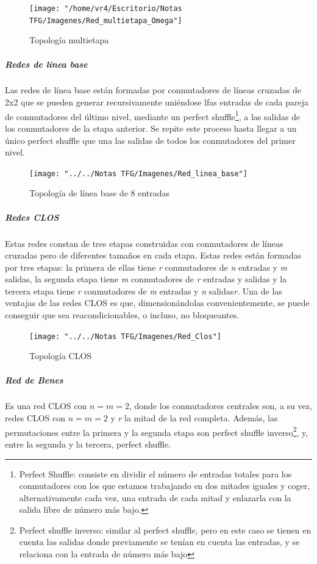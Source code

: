 \newpage			

			\begin{figure}[H]
				\centering
				\texttt{[image: "/home/vr4/Escritorio/Notas TFG/Imagenes/Red\_multietapa\_Omega"]}
				\caption{Topología multietapa}
				\label{fig:redmultietapa}
			\end{figure}
		
\subparagraph{Redes de línea base} 
Las redes de línea base están formadas por conmutadores de líneas cruzadas de 2x2 que se pueden generar recursivamente uniéndose lfas entradas de cada pareja de conmutadores del último nivel, mediante un perfect shuffle\footnote{Perfect Shuffle: consiste en dividir el número de entradas totales para los conmutadores con los que estamos trabajando en dos mitades iguales y coger, alternativamente cada vez, una entrada de cada mitad y enlazarla con la salida libre de número más bajo.}, a las salidas de los conmutadores de la etapa anterior. Se repite este proceso hasta llegar a un único perfect shuffle que una las salidas de todos los conmutadores del primer nivel. 
			
			\begin{figure}[H]
				\centering
				\texttt{[image: "../../Notas TFG/Imagenes/Red\_linea\_base"]}
				\caption{Topología de línea base de 8 entradas}
				\label{fig:redlineabase}
			\end{figure}
		
\subparagraph{Redes CLOS} 
Estas redes constan de tres etapas construidas con conmutadores de líneas cruzadas pero de diferentes tamaños en cada etapa. Estas redes están formadas por tres etapas: la primera de ellas tiene \textit{r} conmutadores de \textit{n} entradas y \textit{m} salidas, la segunda etapa tiene \textit{m} conmutadores de \textit{r} entradas y salidas y la tercera etapa tiene \textit{r} conmutadores de \textit{m} entradas y \textit{n} salidas\textit{r}. Una de las ventajas de las redes CLOS es que, dimensionándolas convenientemente, se puede conseguir que sea reacondicionables, o incluso, no bloqueantes.
			
				\begin{figure}[H]
					\centering
					\texttt{[image: "../../Notas TFG/Imagenes/Red\_Clos"]}
					\caption{Topología CLOS}
					\label{fig:redclos}
				\end{figure}
			
\subparagraph{Red de Benes} 
Es una red CLOS con $n = m = 2$, donde los conmutadores centrales son, a su vez, redes CLOS con $n = m = 2$ y \textit{r} la mitad de la red completa. Además, las permutaciones entre la primera y la segunda etapa son perfect shuffle inverso\footnote{Perfect shuffle inverso: similar al perfect shuffle, pero en este caso se tienen en cuenta las salidas donde previamente se tenían en cuenta las entradas, y se relaciona con la entrada de número más bajo}, y, entre la segunda y la tercera, perfect shuffle.
			
